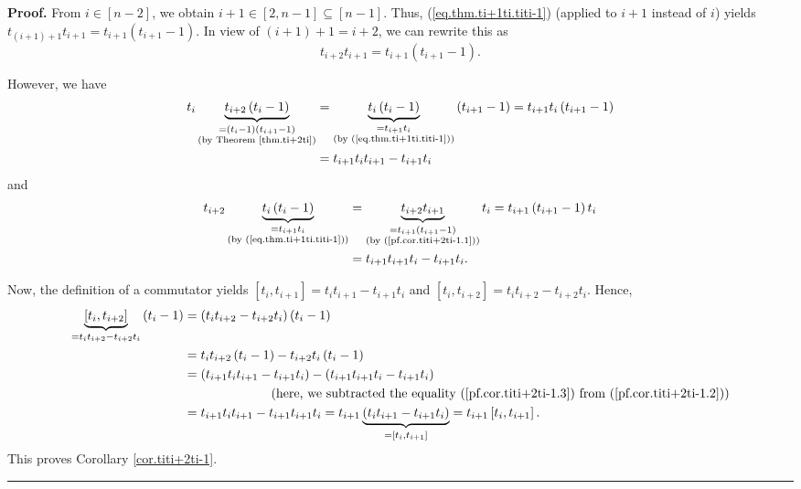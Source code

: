 \documentclass[numbers=enddot,12pt,final,onecolumn,notitlepage]{scrartcl}%
\theoremstyle{definition}
\newenvironment{proof}[1][Proof]{\noindent\textbf{#1.} }{\ \rule{0.5em}{0.5em}}
\begin{document}
\begin{proof}
From $i\in\left[  n-2\right]  $, we obtain $i+1\in\left[  2,n-1\right]
\subseteq\left[  n-1\right]  $. Thus, (\ref{eq.thm.ti+1ti.titi-1}) (applied to
$i+1$ instead of $i$) yields $t_{\left(  i+1\right)  +1}t_{i+1}=t_{i+1}\left(
t_{i+1}-1\right)  $. In view of $\left(  i+1\right)  +1=i+2$, we can rewrite
this as%
\begin{equation}
t_{i+2}t_{i+1}=t_{i+1}\left(  t_{i+1}-1\right)  . \label{pf.cor.titi+2ti-1.1}%
\end{equation}


However, we have
\begin{align}
t_{i}\underbrace{t_{i+2}\left(  t_{i}-1\right)  }_{\substack{=\left(
t_{i}-1\right)  \left(  t_{i+1}-1\right)  \\\text{(by Theorem \ref{thm.ti+2ti}%
)}}}  &  =\underbrace{t_{i}\left(  t_{i}-1\right)  }_{\substack{=t_{i+1}%
t_{i}\\\text{(by (\ref{eq.thm.ti+1ti.titi-1}))}}}\left(  t_{i+1}-1\right)
=t_{i+1}t_{i}\left(  t_{i+1}-1\right) \nonumber\\
&  =t_{i+1}t_{i}t_{i+1}-t_{i+1}t_{i} \label{pf.cor.titi+2ti-1.2}%
\end{align}
and%
\begin{align}
t_{i+2}\underbrace{t_{i}\left(  t_{i}-1\right)  }_{\substack{=t_{i+1}%
t_{i}\\\text{(by (\ref{eq.thm.ti+1ti.titi-1}))}}}  &  =\underbrace{t_{i+2}%
t_{i+1}}_{\substack{=t_{i+1}\left(  t_{i+1}-1\right)  \\\text{(by
(\ref{pf.cor.titi+2ti-1.1}))}}}t_{i}=t_{i+1}\left(  t_{i+1}-1\right)
t_{i}\nonumber\\
&  =t_{i+1}t_{i+1}t_{i}-t_{i+1}t_{i}. \label{pf.cor.titi+2ti-1.3}%
\end{align}


Now, the definition of a commutator yields $\left[  t_{i},t_{i+1}\right]
=t_{i}t_{i+1}-t_{i+1}t_{i}$ and $\left[  t_{i},t_{i+2}\right]  =t_{i}%
t_{i+2}-t_{i+2}t_{i}$. Hence,%
\begin{align*}
\underbrace{\left[  t_{i},t_{i+2}\right]  }_{=t_{i}t_{i+2}-t_{i+2}t_{i}%
}\left(  t_{i}-1\right)   &  =\left(  t_{i}t_{i+2}-t_{i+2}t_{i}\right)
\left(  t_{i}-1\right) \\
&  =t_{i}t_{i+2}\left(  t_{i}-1\right)  -t_{i+2}t_{i}\left(  t_{i}-1\right) \\
&  =\left(  t_{i+1}t_{i}t_{i+1}-t_{i+1}t_{i}\right)  -\left(  t_{i+1}%
t_{i+1}t_{i}-t_{i+1}t_{i}\right) \\
&  \ \ \ \ \ \ \ \ \ \ \ \ \ \ \ \ \ \ \ \ \left(  \text{here, we subtracted
the equality (\ref{pf.cor.titi+2ti-1.3}) from (\ref{pf.cor.titi+2ti-1.2}%
)}\right) \\
&  =t_{i+1}t_{i}t_{i+1}-t_{i+1}t_{i+1}t_{i}=t_{i+1}\underbrace{\left(
t_{i}t_{i+1}-t_{i+1}t_{i}\right)  }_{=\left[  t_{i},t_{i+1}\right]  }%
=t_{i+1}\left[  t_{i},t_{i+1}\right]  .
\end{align*}
This proves Corollary \ref{cor.titi+2ti-1}.
\end{proof}
\end{document}
